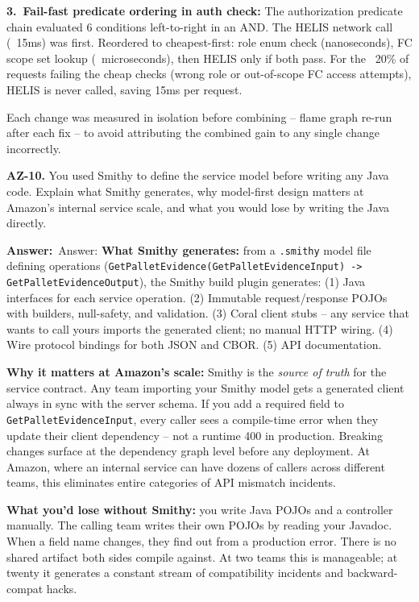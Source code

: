 \documentclass[letterpaper,10pt]{article}
\newlength{\boxwidth}
\newcommand{\answerlabel}{\noindent\textbf{\textcolor{answerblue}{Answer:}}~}
\begin{document}
\textbf{3.~Fail-fast predicate ordering in auth check:} The authorization predicate chain evaluated 6 conditions left-to-right in an AND. The HELIS network call (~15ms) was first. Reordered to cheapest-first: role enum check (nanoseconds), FC scope set lookup (~microseconds), then HELIS only if both pass. For the ~20\% of requests failing the cheap checks (wrong role or out-of-scope FC access attempts), HELIS is never called, saving 15ms per request.

Each change was measured in isolation before combining -- flame graph re-run after each fix -- to avoid attributing the combined gain to any single change incorrectly.

\vspace{6pt}

\colorbox{qbg}{\begin{minipage}{\boxwidth}
\textbf{AZ-10.} You used Smithy to define the service model before writing any Java code. Explain what Smithy generates, why model-first design matters at Amazon's internal service scale, and what you would lose by writing the Java directly.
\end{minipage}}

\vspace{2pt}
\answerlabel{Answer:} \textbf{What Smithy generates:} from a \texttt{.smithy} model file defining operations (\texttt{GetPalletEvidence(GetPalletEvidenceInput) -> GetPalletEvidenceOutput}), the Smithy build plugin generates: (1) Java interfaces for each service operation. (2) Immutable request/response POJOs with builders, null-safety, and validation. (3) Coral client stubs -- any service that wants to call yours imports the generated client; no manual HTTP wiring. (4) Wire protocol bindings for both JSON and CBOR. (5) API documentation.

\textbf{Why it matters at Amazon's scale:} Smithy is the \textit{source of truth} for the service contract. Any team importing your Smithy model gets a generated client always in sync with the server schema. If you add a required field to \texttt{GetPalletEvidenceInput}, every caller sees a compile-time error when they update their client dependency -- not a runtime 400 in production. Breaking changes surface at the dependency graph level before any deployment. At Amazon, where an internal service can have dozens of callers across different teams, this eliminates entire categories of API mismatch incidents.

\textbf{What you'd lose without Smithy:} you write Java POJOs and a controller manually. The calling team writes their own POJOs by reading your Javadoc. When a field name changes, they find out from a production error. There is no shared artifact both sides compile against. At two teams this is manageable; at twenty it generates a constant stream of compatibility incidents and backward-compat hacks.
\end{document}
